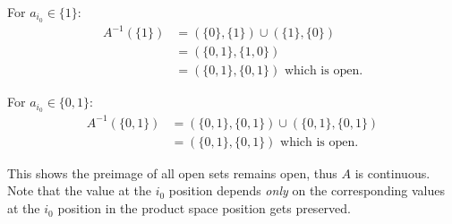\documentclass{jhwhw}
\begin{document}
For $a_{i_0}\in \{1\}$: 
\begin{align}A^{-1}(\{1\}) &= (\{0\},\{1\})\cup(\{1\},\{0\}) \\
&= (\{0,1\},\{1,0\})\\
&= (\{0,1\},\{0,1\}) \text{ which is open.}
\end{align}

For $a_{i_0}\in \{0,1\}$: 
\begin{align}A^{-1}(\{0,1\}) &= (\{0,1\},\{0,1\})\cup(\{0,1\},\{0,1\}) \\
&= (\{0,1\},\{0,1\}) \text{ which is open.}
\end{align}

This shows the preimage of all open sets remains open, thus $A$ is continuous. 
\\

Note that the value at the $i_0$ position depends {\em only} on the corresponding values at the $i_0$ position in the product space \textendash position gets preserved.
\end{document}
